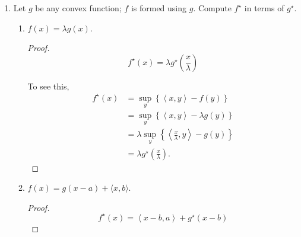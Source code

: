 \documentclass[11pt]{amsart}
\begin{document}
\begin{enumerate}
\begin{enumerate}
\begin{proof}
    We can take the derivative of $xy - y\log y$ with respect to $y$, set this
    equal to $0$, and solve for $y$. We find that $y = \exp\left(x -
      1\right)$. Substituting, we obtained the desired result.
  \end{proof}
\end{enumerate}


\bigskip\bigskip



\item  Let $g$ be any convex function; $f$ is formed using $g$.
Compute $f^\star$ in terms of $g^\star$.  
\begin{enumerate}
\item $f(x) = \lambda g(x)$.
  \begin{proof}
    \begin{equation*}
      \boxed{f^\star\left(x\right)
      = \lambda g^\star\left(\frac{x}{\lambda}\right)}
    \end{equation*}

    To see this,
    \begin{align*}
      f^\star\left(x\right)
      &= \sup_{y} \left\{\left\langle x, y \right\rangle - f(y)\right\} \\
      &= \sup_{y} \left\{\left\langle x, y \right\rangle - \lambda g(y)\right\} \\
      &= \lambda \sup_{y}
        \left\{\left\langle \frac{x}{\lambda}, y \right\rangle - g(y)\right\} \\
      &= \lambda g^\star\left(\frac{x}{\lambda}\right).
    \end{align*}
  \end{proof}
\item $f(x) = g(x-a) + \langle x, b \rangle$.
  \begin{proof}
    \begin{equation*}
      \boxed{f^\star\left(x\right)
        = \left\langle x - b, a \right\rangle + g^\star\left(x - b\right)}
    \end{equation*}
    

\end{proof}
\end{enumerate}
\end{enumerate}
\end{document}
